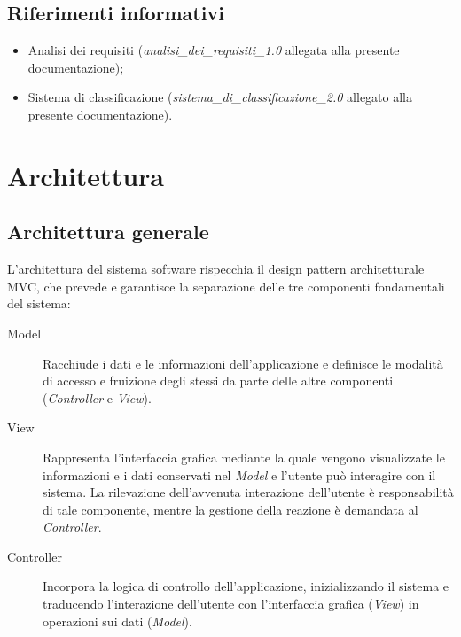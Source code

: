 \documentclass[10pt,a4paper,headinclude,footinclude,hidelinks]{scrreprt} %
\begin{document}


	\section{Riferimenti informativi}
	\begin{itemize}
	\item Analisi dei requisiti (\textit{analisi\_dei\_requisiti\_1.0} allegata alla presente documentazione);
	\item Sistema di classificazione (\textit{sistema\_di\_classificazione\_2.0} allegato alla presente documentazione).
	\end{itemize}

	\chapter{Architettura}
	\label{ch:stage:design:architettura}

	\section{Architettura generale}
	\label{sec:stage:design:architettura:mvc}
	L'architettura del sistema software rispecchia il design pattern architetturale MVC, che prevede e garantisce la separazione delle tre componenti fondamentali del sistema:
	\begin{description}
	\item[Model] Racchiude i dati e le informazioni dell'applicazione e definisce le modalità di accesso e fruizione degli stessi da parte delle altre componenti (\textit{Controller} e \textit{View}).
 	\item[View] Rappresenta l'interfaccia grafica mediante la quale vengono visualizzate le informazioni e i dati conservati nel \textit{Model} e l'utente può interagire con il sistema. La rilevazione dell'avvenuta interazione dell'utente è responsabilità di tale componente, mentre la gestione della reazione è demandata al \textit{Controller}.
	\item[Controller] Incorpora la logica di controllo dell'applicazione, inizializzando il sistema e traducendo l'interazione dell'utente con l'interfaccia grafica (\textit{View}) in operazioni sui dati (\textit{Model}).
	\end{description}
\end{document}
